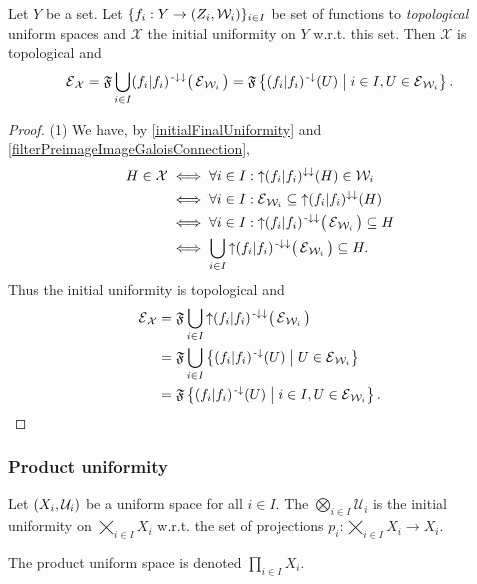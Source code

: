 \begin{proposition} \label{topologicalInitialUniformity}
Let $Y$ be a set. Let $\{f_i: Y\to \left( Z_i, \mathcal{W}_i \right)\}_{i\in I}$ be set of functions to \emph{topological} uniform spaces and $\mathcal{X}$ the initial uniformity on $Y$ w.r.t. this set. Then $\mathcal{X}$ is topological and
\[ \operatorname{\mathcal{E}}_\mathcal{X} = \mathfrak{F}\bigcup_{i\in I} (f_i|f_i)^{{\text{\hspace{0.15em}-}\downarrow}\downarrow}\big(\operatorname{\mathcal{E}}_{\mathcal{W}_i}\big) = \mathfrak{F}\left\{ (f_i|f_i)^{\text{\hspace{0.15em}-}\downarrow}(U) \;\middle|\; i\in I, U\in \operatorname{\mathcal{E}}_{\mathcal{W}_i} \right\}. \]
\end{proposition}
\begin{proof}
(1) We have, by \ref{initialFinalUniformity} and \ref{filterPreimageImageGaloisConnection},
\begin{align*}
H \in \mathcal{X} &\iff \forall i\in I: \operatorname{\uparrow}(f_i|f_i)^{\downarrow\downarrow}(H) \in \mathcal{W}_i \\
&\iff \forall i\in I: \operatorname{\mathcal{E}}_{\mathcal{W}_i} \subseteq \operatorname{\uparrow}(f_i|f_i)^{\downarrow\downarrow}(H) \\
&\iff \forall i\in I: \operatorname{\uparrow} (f_i|f_i)^{{\text{\hspace{0.15em}-}\downarrow}\downarrow}\big(\operatorname{\mathcal{E}}_{\mathcal{W}_i}\big) \subseteq H \\
&\iff \bigcup_{i\in I} \operatorname{\uparrow} (f_i|f_i)^{{\text{\hspace{0.15em}-}\downarrow}\downarrow}\big(\operatorname{\mathcal{E}}_{\mathcal{W}_i}\big) \subseteq H.
\end{align*}
Thus the initial uniformity is topological and
\begin{align*}
\operatorname{\mathcal{E}}_\mathcal{X} &= \mathfrak{F}\bigcup_{i\in I} \operatorname{\uparrow} (f_i|f_i)^{{\text{\hspace{0.15em}-}\downarrow}\downarrow}\big(\operatorname{\mathcal{E}}_{\mathcal{W}_i}\big) \\
&= \mathfrak{F}\bigcup_{i\in I}\left\{ (f_i|f_i)^{\text{\hspace{0.15em}-}\downarrow}(U) \;\middle|\; U\in \operatorname{\mathcal{E}}_{\mathcal{W}_i} \right\} \\
&= \mathfrak{F}\left\{ (f_i|f_i)^{\text{\hspace{0.15em}-}\downarrow}(U) \;\middle|\; i\in I, U\in \operatorname{\mathcal{E}}_{\mathcal{W}_i} \right\}.
\end{align*}
\end{proof}

\subsubsection{Product uniformity}
\begin{definition}
Let $\left( X_i, \mathcal{U}_i \right)$ be a uniform space for all $i\in I$. The  $\bigotimes_{i\in I}\mathcal{U}_i$ is the initial uniformity on $\bigtimes_{i\in I}X_i$ w.r.t. the set of projections $p_i: \bigtimes_{i\in I}X_i \to X_i$.

The product uniform space is denoted $\prod_{i\in I}X_i$.
\end{definition}

